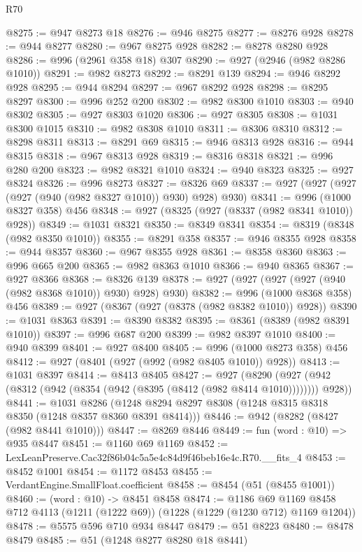 \begin{lexlean}{R70}
\begin{coremodule}
@8275 := @947 @8273 @18
@8276 := @946 @8275
@8277 := @8276 @928
@8278 := @944 @8277
@8280 := @967 @8275 @928
@8282 := @8278 @8280 @928
@8286 := @996 (@2961 @358 @18) @307
@8290 := @927 (@2946 (@982 @8286 @1010))
@8291 := @982 @8273
@8292 := @8291 @139
@8294 := @946 @8292 @928
@8295 := @944 @8294
@8297 := @967 @8292 @928
@8298 := @8295 @8297
@8300 := @996 @252 @200
@8302 := @982 @8300 @1010
@8303 := @940 @8302
@8305 := @927 @8303 @1020
@8306 := @927 @8305
@8308 := @1031 @8300 @1015
@8310 := @982 @8308 @1010
@8311 := @8306 @8310
@8312 := @8298 @8311
@8313 := @8291 @69
@8315 := @946 @8313 @928
@8316 := @944 @8315
@8318 := @967 @8313 @928
@8319 := @8316 @8318
@8321 := @996 @280 @200
@8323 := @982 @8321 @1010
@8324 := @940 @8323
@8325 := @927 @8324
@8326 := @996 @8273
@8327 := @8326 @69
@8337 := @927 (@927 (@927 (@927 (@940 (@982 @8327 @1010)) @930) @928) @930)
@8341 := @996 (@1000 @8327 @358) @456
@8348 := @927 (@8325 (@927 (@8337 (@982 @8341 @1010)) @928))
@8349 := @1031 @8321
@8350 := @8349 @8341
@8354 := @8319 (@8348 (@982 @8350 @1010))
@8355 := @8291 @358
@8357 := @946 @8355 @928
@8358 := @944 @8357
@8360 := @967 @8355 @928
@8361 := @8358 @8360
@8363 := @996 @665 @200
@8365 := @982 @8363 @1010
@8366 := @940 @8365
@8367 := @927 @8366
@8368 := @8326 @139
@8378 := @927 (@927 (@927 (@927 (@940 (@982 @8368 @1010)) @930) @928) @930)
@8382 := @996 (@1000 @8368 @358) @456
@8389 := @927 (@8367 (@927 (@8378 (@982 @8382 @1010)) @928))
@8390 := @1031 @8363
@8391 := @8390 @8382
@8395 := @8361 (@8389 (@982 @8391 @1010))
@8397 := @996 @687 @200
@8399 := @982 @8397 @1010
@8400 := @940 @8399
@8401 := @927 @8400
@8405 := @996 (@1000 @8273 @358) @456
@8412 := @927 (@8401 (@927 (@992 (@982 @8405 @1010)) @928))
@8413 := @1031 @8397
@8414 := @8413 @8405
@8427 := @927
    (@8290 (@927 (@942 (@8312 (@942 (@8354 (@942 (@8395 (@8412 (@982 @8414 @1010)))))))) @928))
@8441 := @1031
    @8286
    (@1248 @8294 @8297 @8308 (@1248 @8315 @8318 @8350 (@1248 @8357 @8360 @8391 @8414)))
@8446 := @942 (@8282 (@8427 (@982 @8441 @1010)))
@8447 := @8269 @8446
@8449 := fun (word : @10) => @935 @8447
@8451 := @1160 @69 @1169
@8452 := LexLeanPreserve.Cac32f86b04c5a5e4c84d9f46beb16e4c.R70.__fits_4
@8453 := @8452 @1001
@8454 := @1172 @8453
@8455 := VerdantEngine.SmallFloat.coefficient
@8458 := @8454 (@51 (@8455 @1001))
@8460 := (word : @10) -> @8451 @8458
@8474 := @1186
    @69
    @1169
    @8458
    @712
    @4113
    (@1211 (@1222 @69))
    (@1228 (@1229 (@1230 @712) @1169 @1204))
@8478 := @5575 @596 @710 @934 @8447
@8479 := @51 @8223
@8480 := @8478 @8479
@8485 := @51 (@1248 @8277 @8280 @18 @8441)

\end{coremodule}
\end{lexlean}
